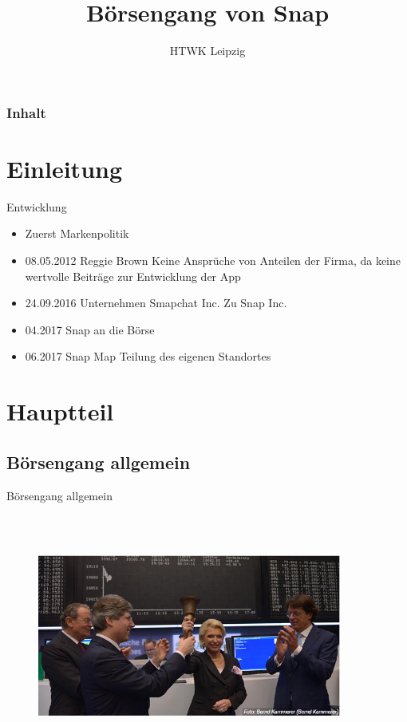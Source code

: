 \documentclass{beamer}
\title{Börsengang von Snap}
\institute{Alex Dudin, Hendrik Schick, Andre Hildebrandt}
\author[]{HTWK Leipzig} %
\begin{document}
\begin{frame}
\titlepage
\end{frame}

\begin{frame}
\frametitle{Inhalt}
\tableofcontents
\end{frame}

\section{Einleitung}



\begin{frame} {Entwicklung}
\begin{itemize}
\item Zuerst Markenpolitik \pause
\item  08.05.2012 Reggie Brown Keine Ansprüche von Anteilen der Firma, da keine wertvolle Beiträge zur Entwicklung der App \pause
\item  24.09.2016 Unternehmen Smapchat Inc. Zu Snap Inc. \pause
\item  04.2017 Snap an die Börse \pause
\item 06.2017 Snap Map Teilung des eigenen Standortes \pause

\end{itemize}
\end{frame}


\section{Hauptteil}


\subsection{Börsengang allgemein}

\begin{frame} {Börsengang allgemein}
\begin{figure}
	\centering
	\includegraphics[width=10cm, height=8cm]{boersenglockeeinfuehrung.PNG}
\end{figure}
\end{frame}
\end{document}
